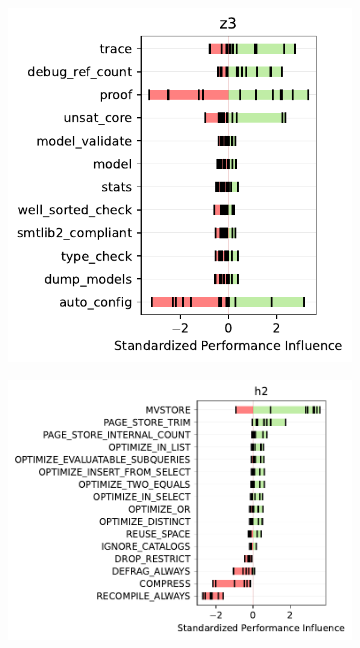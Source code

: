 {{{\begin{figure}
\begin{subfigure}{0.3\linewidth}
		\includegraphics[width=\linewidth]{images/z3.pdf}
		\caption{\zdrei}
		\label{fig:overview_z3}
	\end{subfigure}
	\begin{subfigure}{0.4\linewidth}
		\centering
		\includegraphics[width=\linewidth]{images/h2.pdf}
		\caption{\htwo}
		\label{fig:overview_h2}
	\end{subfigure}
	

\end{figure}}}}

